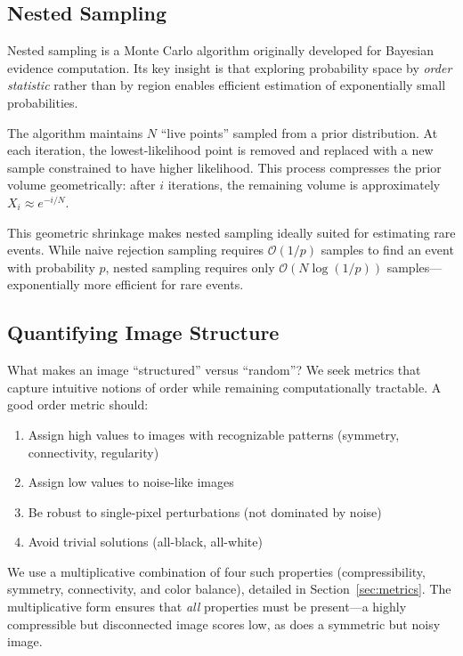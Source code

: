 \documentclass{article}
\begin{document}
\subsection{Nested Sampling}

Nested sampling \cite{skilling2006nested} is a Monte Carlo algorithm originally developed for Bayesian evidence computation. Its key insight is that exploring probability space by \emph{order statistic} rather than by region enables efficient estimation of exponentially small probabilities.

The algorithm maintains $N$ ``live points'' sampled from a prior distribution. At each iteration, the lowest-likelihood point is removed and replaced with a new sample constrained to have higher likelihood. This process compresses the prior volume geometrically: after $i$ iterations, the remaining volume is approximately $X_i \approx e^{-i/N}$.

This geometric shrinkage makes nested sampling ideally suited for estimating rare events. While naive rejection sampling requires $\mathcal{O}(1/p)$ samples to find an event with probability $p$, nested sampling requires only $\mathcal{O}(N \log(1/p))$ samples---exponentially more efficient for rare events.

\subsection{Quantifying Image Structure}

What makes an image ``structured'' versus ``random''? We seek metrics that capture intuitive notions of order while remaining computationally tractable. A good order metric should:

\begin{enumerate}
    \item Assign high values to images with recognizable patterns (symmetry, connectivity, regularity)
    \item Assign low values to noise-like images
    \item Be robust to single-pixel perturbations (not dominated by noise)
    \item Avoid trivial solutions (all-black, all-white)
\end{enumerate}

We use a multiplicative combination of four such properties (compressibility, symmetry, connectivity, and color balance), detailed in Section~\ref{sec:metrics}. The multiplicative form ensures that \emph{all} properties must be present---a highly compressible but disconnected image scores low, as does a symmetric but noisy image.
\end{document}

